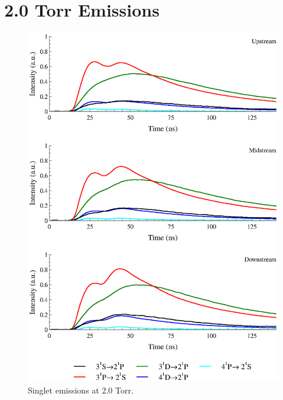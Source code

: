 \section{2.0 Torr Emissions}
\begin{figure}
  \centering
  \includegraphics{./chapters/extraem/figures/2torr_s.eps}
  \caption{Singlet emissions at 2.0 Torr.}
\end{figure}
